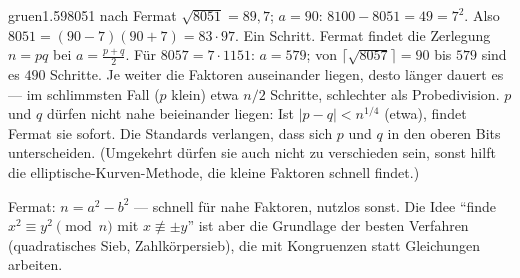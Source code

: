 \begin{loesungkarte}{gruen}{1.59}{8051 nach Fermat}
$\sqrt{8051} = 89{,}7$; $a = 90$: $8100 - 8051 = 49 = 7^{2}$. Also $8051 = (90 - 7)(90 + 7) = 83\cdot97$. Ein Schritt.
Fermat findet die Zerlegung $n = pq$ bei $a = \frac{p + q}2$. Für $8057 = 7\cdot1151$: $a = 579$; von $\lceil\sqrt{8057}\rceil = 90$ bis $579$ sind es $490$ Schritte. Je weiter die Faktoren auseinander liegen, desto länger dauert es --- im schlimmsten Fall ($p$ klein) etwa $n/2$ Schritte, schlechter als Probedivision.
$p$ und $q$ dürfen nicht nahe beieinander liegen: Ist $|p - q| < n^{1/4}$ (etwa), findet Fermat sie sofort. Die Standards verlangen, dass sich $p$ und $q$ in den oberen Bits unterscheiden. (Umgekehrt dürfen sie auch nicht zu verschieden sein, sonst hilft die elliptische-Kurven-Methode, die kleine Faktoren schnell findet.)
\begin{mitnehmen}\kastentext
Fermat: $n = a^{2} - b^{2}$ --- schnell für nahe Faktoren, nutzlos sonst. Die Idee \enquote{finde $x^{2}\equiv y^{2}\pmod n$ mit $x\not\equiv\pm y$} ist aber die Grundlage der besten Verfahren (quadratisches Sieb, Zahlkörpersieb), die mit Kongruenzen statt Gleichungen arbeiten.
\end{mitnehmen}
\end{loesungkarte}

